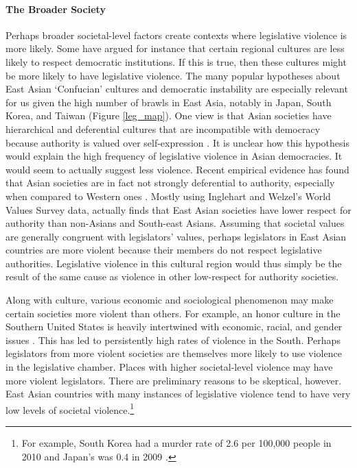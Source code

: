\documentclass[a4paper]{article}\usepackage[]{graphicx}\usepackage[]{color}
\begin{document}
\paragraph{The Broader Society}

Perhaps broader societal-level factors create contexts where legislative violence is more likely. Some have argued for instance that certain regional cultures are less likely to respect democratic institutions. If this is true, then these cultures might be more likely to have legislative violence. The many popular hypotheses about East Asian `Confucian' cultures \citep[]{Inglehart2005, Inglehart2010} and democratic instability are especially relevant for us given the high number of brawls in East Asia, notably in Japan, South Korea, and Taiwan (Figure \ref{leg_map}). One view is that Asian societies have hierarchical and deferential cultures that are incompatible with democracy because authority is valued over self-expression \citep[212-213]{Dalton2005}. It is unclear how this hypothesis would explain the high frequency of legislative violence in Asian democracies. It would seem to actually suggest less violence. Recent empirical evidence has found that Asian societies are in fact not strongly deferential to authority, especially when compared to Western ones \citep{Dalton2005, KimAsianValues2010}. Mostly using Inglehart and Welzel's World Values Survey data, \cite{KimAsianValues2010} actually finds that East Asian societies have lower respect for authority than non-Asians and South-east Asians. Assuming that societal values are generally congruent with legislators' values, perhaps legislators in East Asian countries are more violent because their members do not respect legislative authorities. Legislative violence in this cultural region would thus simply be the result of the same cause as violence in other low-respect for authority societies.

Along with culture, various economic and sociological phenomenon may make certain societies more violent than others. For example, an honor culture in the Southern United States is heavily intertwined with economic, racial, and gender issues \citep[]{nisbett1996culture}. This has led to persistently high rates of violence in the South. Perhaps legislators from more violent societies are themselves more likely to use violence in the legislative chamber. Places with higher societal-level violence may have more violent legislators. There are preliminary reasons to be skeptical, however. East Asian countries with many instances of legislative violence tend to have very low levels of societal violence.\footnote{For example, South Korea had a murder rate of 2.6 per 100,000 people in 2010 and Japan's was 0.4 in 2009 \cite{UNMurder2013}.}
\end{document}
